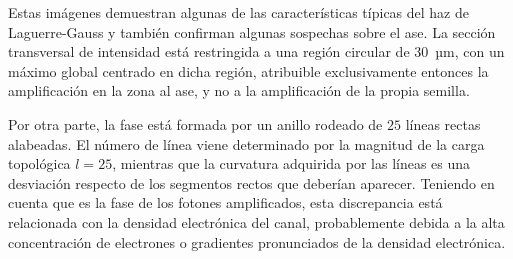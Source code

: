 Estas imágenes demuestran algunas de las características típicas del haz de Laguerre-Gauss y también confirman algunas sospechas sobre el \acrshort{ase}. La sección transversal de intensidad está restringida a una región circular de \qty{30}{µm}, con un máximo global centrado en dicha región, atribuible exclusivamente entonces la amplificación en la zona al \acrshort{ase}, y no a la amplificación de la propia semilla. 

Por otra parte, la fase está formada por un anillo rodeado de $25$ líneas rectas alabeadas. El número de línea viene determinado por la magnitud de la carga topológica $l=25$, mientras que la curvatura adquirida por las líneas es una desviación respecto de los segmentos rectos que deberían aparecer. Teniendo en cuenta que es la fase de los fotones amplificados, esta discrepancia está relacionada con la densidad electrónica del canal, probablemente debida a la alta concentración de electrones o gradientes pronunciados de la densidad electrónica.

